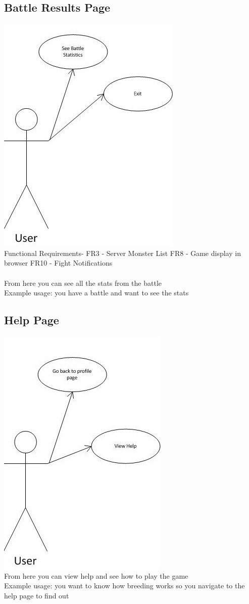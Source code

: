\documentclass{project}
\begin{document}
\subsection{Battle Results Page}
\includegraphics[scale=0.6]{BattleResultsPageUseCase.jpg}
\\
Functional Requirements-
FR3 - Server Monster List
FR8 - Game display in browser
FR10 - Fight Notifications
\\
\\
From here you can see all the stats from the battle
\\
Example usage: you have a battle and want to see the stats

\newpage
\subsection{Help Page}
\includegraphics[scale=0.6]{HelpPageUseCase.jpg}
\\
From here you can view help and see how to play the game
\\
Example usage: you want to know how breeding works so you navigate to the help page to find out
\end{document}

